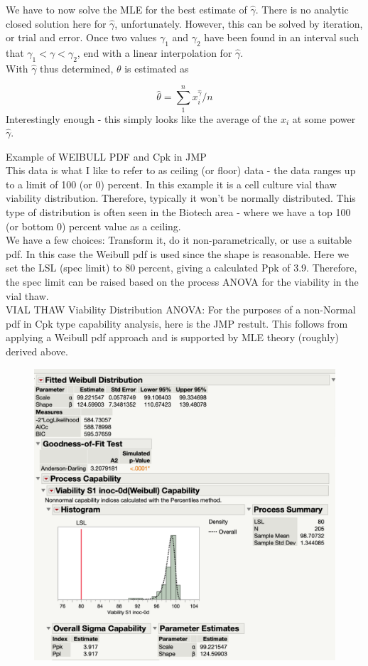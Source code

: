 \documentclass[11pt, oneside]{article}	%
\begin{document}
\noindent
We have to now solve the MLE for the best estimate of $\hat{\gamma}$. There is no analytic closed solution here for $\hat{\gamma}$, unfortunately. However, this can be solved by iteration, or trial and error. Once two values $\gamma_{1}$ and $\gamma_{2}$ have been found in an interval such that $\gamma_{1}<\gamma<\gamma_{2}$, end with a linear interpolation for $\hat{\gamma}$.\\




With $\hat{\gamma}$ thus determined, $\theta$ is estimated as

$$
\hat{\theta}=\sum_{1}^{n} x_{i}^{\hat{\gamma}} / n
$$
\noindent
Interestingly enough - this simply looks like the average of the $x_{i}$ at some power $\hat{\gamma}$.



\newpage
Example of WEIBULL PDF and Cpk in JMP\\ 

This data is what I like to refer to as ceiling (or floor) data - the data ranges up to a limit of 100 (or 0) percent. In this example it is a cell culture vial thaw viability distribution. Therefore, typically it won't be normally distributed. This type of distribution is often seen in the Biotech area - where we have a top 100 (or bottom 0) percent value as a ceiling.\\

We have a few choices: Transform it, do it non-parametrically, or use a suitable pdf. In this case the Weibull pdf is used since the shape is reasonable. Here we set the LSL (spec limit) to 80 percent, giving a calculated Ppk of 3.9. Therefore, the spec limit can be raised based on the process ANOVA for the viability in the vial thaw.\\ 

VIAL THAW Viability Distribution ANOVA: For the purposes of a non-Normal pdf in Cpk type capability analysis, here is the JMP restult. This follows from applying a Weibull pdf approach and is supported by MLE theory (roughly) derived above. 

\begin{figure}[H]
\centering
\includegraphics[scale=0.40]{Anova Weibull JS1 seed Example.png}
\end{figure}
\end{document}
